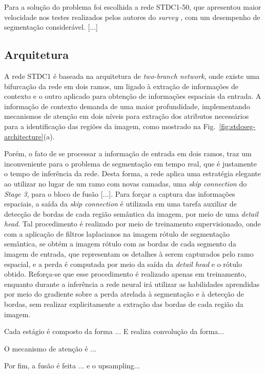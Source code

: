 \documentclass[conference]{IEEEtran}
\begin{document}
Para a solução do problema foi escolhida a rede STDC1-50, que apresentou maior velocidade nos testes realizados pelos autores do \textit{survey} \cite{papadeas2021RealTimeSemanticImage}, com um desempenho de segmentação considerável. [...]

\subsection{Arquitetura}

A rede STDC1 \cite{fan2021RethinkingBiSeNetRealtime} é baseada na arquitetura de \textit{two-branch network}, onde existe uma bifurcação da rede em dois ramos, um ligado à extração de informações de contexto e o outro aplicado para obtenção de informações espaciais da entrada. A informação de contexto demanda de uma maior profundidade, implementando mecanismos de atenção em dois níveis para extração dos atributos necessários para a identificação das regiões da imagem, como mostrado na Fig.~\ref{fig:stdcseg-architecture}(a).

Porém, o fato de se processar a informação de entrada em dois ramos, traz um inconveniente para o problema de segmentação em tempo real, que é justamente o tempo de inferência da rede. Desta forma, a rede aplica uma estratégia elegante ao utilizar no lugar de um ramo com novas camadas, uma \textit{skip connection} do \textit{Stage 3}, para o bloco de fusão [...]. Para forçar a captura das informações espaciais, a saída da \textit{skip connection} é utilizada em uma tarefa auxiliar de detecção de bordas de cada região semântica da imagem, por meio de uma \textit{detail head}. Tal procedimento é realizado por meio de treinamento supervisionado, onde com a aplicação de filtros laplacianos na imagem rótulo de segmentação semântica, se obtém a imagem rótulo com as bordas de cada segmento da imagem de entrada, que representam os detalhes à serem capturados pelo ramo espacial, e a perda é computada por meio da saída da \textit{detail head} e o rótulo obtido. Reforça-se que esse procedimento é realizado apenas em treinamento, enquanto durante a inferência a rede neural irá utilizar as habilidades aprendidas por meio do gradiente sobre a perda atrelada à segmentação e à detecção de bordas, sem realizar explicitamente a extração das bordas de cada região da imagem.

Cada estágio é composto da forma ... E realiza convolução da forma...

O mecanismo de atenção é ...

Por fim, a fusão é feita ... e o upsampling...
\end{document}
